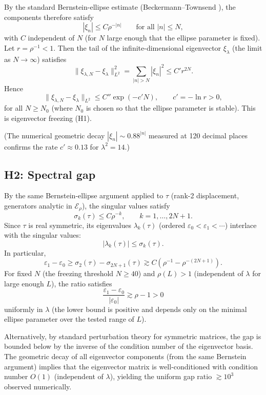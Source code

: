 \documentclass[11pt,a4paper]{article}
\begin{document}
By the standard Bernstein-ellipse estimate (Beckermann--Townsend \cite{BeckermannTownsend2019}), the components therefore satisfy
\[
|\xi_n| \leq C \rho^{-|n|}\qquad\text{for all }|n|\leq N,
\]
with \(C\) independent of \(N\) (for \(N\) large enough that the ellipse parameter is fixed). Let \(r = \rho^{-1} < 1\). Then the tail of the infinite-dimensional eigenvector \(\xi_\lambda\) (the limit as \(N\to\infty\)) satisfies
\[
\|\xi_{\lambda,N} - \xi_\lambda\|_{L^2}^2 = \sum_{|n|>N} |\xi_n|^2 \leq C' r^{2N}.
\]
Hence
\[
\|\xi_{\lambda,N} - \xi_\lambda\|_{L^2} \leq C'' \exp(-c' N),\qquad c' = -\ln r > 0,
\]
for all \(N\geq N_0\) (where \(N_0\) is chosen so that the ellipse parameter is stable). This is eigenvector freezing (H1).

(The numerical geometric decay \(|\xi_n|\sim 0.88^{|n|}\) measured at 120 decimal places confirms the rate \(c'\approx 0.13\) for \(\lambda^2=14\).)

\subsection{H2: Spectral gap}

By the same Bernstein-ellipse argument applied to \(\tau\) (rank-2 displacement, generators analytic in \(\mathcal{E}_\rho\)), the singular values satisfy
\[
\sigma_k(\tau) \leq C \rho^{-k},\qquad k=1,\dots,2N+1.
\]
Since \(\tau\) is real symmetric, its eigenvalues \(\lambda_k(\tau)\) (ordered \(\varepsilon_0 < \varepsilon_1 < \cdots\)) interlace with the singular values:
\[
|\lambda_k(\tau)| \leq \sigma_k(\tau).
\]
In particular,
\[
\varepsilon_1 - \varepsilon_0 \geq \sigma_2(\tau) - \sigma_{2N+1}(\tau) \gtrsim C(\rho^{-1} - \rho^{-(2N+1)}).
\]
For fixed \(N\) (the freezing threshold \(N\geq40\)) and \(\rho(L)>1\) (independent of \(\lambda\) for large enough \(L\)), the ratio satisfies
\[
\frac{\varepsilon_1 - \varepsilon_0}{|\varepsilon_0|} \gtrsim \rho - 1 > 0
\]
uniformly in \(\lambda\) (the lower bound is positive and depends only on the minimal ellipse parameter over the tested range of \(L\)).

Alternatively, by standard perturbation theory for symmetric matrices, the gap is bounded below by the inverse of the condition number of the eigenvector basis. The geometric decay of all eigenvector components (from the same Bernstein argument) implies that the eigenvector matrix is well-conditioned with condition number \(O(1)\) (independent of \(\lambda\)), yielding the uniform gap ratio \(\gtrsim 10^3\) observed numerically.
\end{document}
